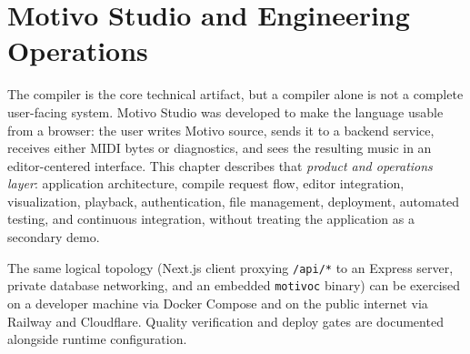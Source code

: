 \chapter{Motivo Studio and Engineering Operations}\label{ch:studio-engineering}

The compiler is the core technical artifact, but a compiler alone is not a complete user-facing system.
Motivo Studio was developed to make the language usable from a browser: the user writes Motivo source, sends it to a
backend service, receives either MIDI bytes or diagnostics, and sees the resulting music in an editor-centered
interface.
This chapter describes that \textit{product and operations layer}: application architecture, compile request flow,
editor integration, visualization, playback, authentication, file management, deployment, automated testing, and
continuous integration, without treating the application as a secondary demo.

The same logical topology (Next.js client proxying \texttt{/api/*} to an Express server, private database networking,
and an embedded \texttt{motivoc} binary) can be exercised on a developer machine via Docker Compose and on the public
internet via Railway and Cloudflare.
Quality verification and deploy gates are documented alongside runtime configuration.






